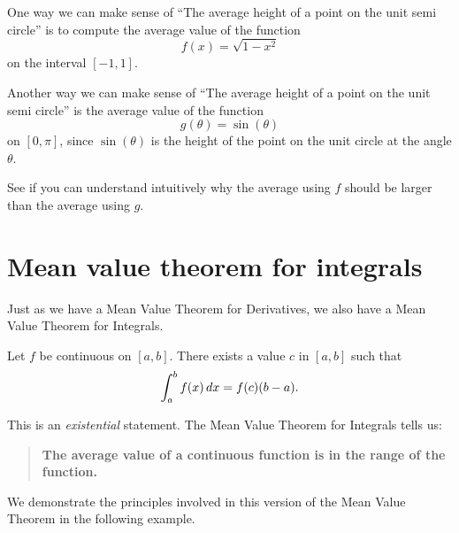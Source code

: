 \documentclass[handout]{ximera}
\begin{document}
\begin{example}	One way we can make sense of ``The average height of a point on the
	unit semi circle'' is to compute the average value of the function
	\[
	f(x) =\sqrt{1-x^2}
	\]
	on the interval $[-1,1]$.
	
\newpage
	
\end{example}

\begin{example}
	Another way we can make sense of ``The average height of a point on the
	unit semi circle'' is the average value of the function
	\[
	g(\theta) =\sin(\theta)
	\]
	on $[0,\pi]$, since $\sin(\theta)$ is the height of the point on the
	unit circle at the angle $\theta$.
	
		See if you can understand intuitively why the average using $f$ should
		be larger than the average using $g$.

\newpage

	\end{example}
	
	
	
	
	\section{Mean value theorem for integrals}
	
	Just as we have a Mean Value Theorem for Derivatives, we also have a
	Mean Value Theorem for Integrals.
	
	
	\begin{theorem}
		Let $f$ be continuous on $[a,b]$. There exists a value $c$ in $[a,b]$
		such that
		\[
		\int_a^bf(x)\mathop{}\!d x = f(c)(b-a).
		\]
	\end{theorem}
	
	This is an \emph{existential} statement. The Mean Value Theorem for
	Integrals tells us:
	\begin{quote}
		\textbf{The average value of a continuous function is in the range of
			the function.}
	\end{quote}
	
	We demonstrate the principles involved in this version of the Mean
	Value Theorem in the following example.
	
\end{document}
